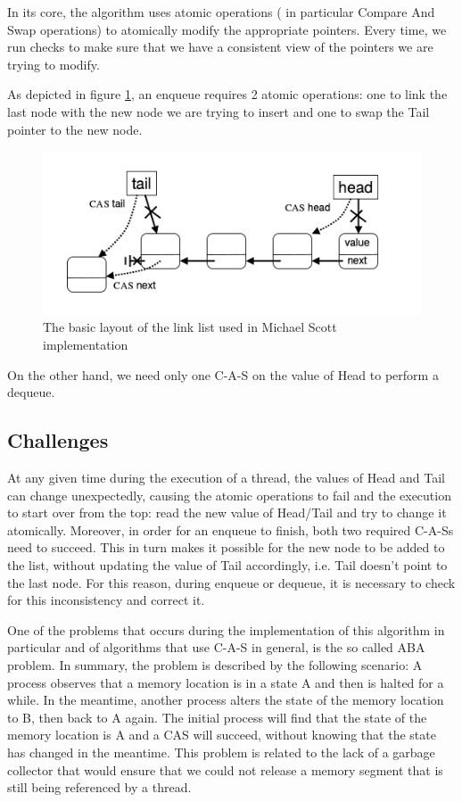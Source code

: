 In its core, the algorithm uses atomic operations ( in particular Compare And Swap operations) to atomically modify the appropriate pointers. Every time, we run checks to make sure that we have a consistent view of the pointers we are trying to modify.

As depicted in figure \ref{ms_queue_struct}, an enqueue requires 2 atomic operations: one to link the last node with the new node we are trying to insert and one to swap the Tail pointer to the new node.

\begin{figure}
 \centering
  \includegraphics[scale=0.4]{msqueue_struct.png}
\caption{ The basic layout of the link list used in Michael Scott implementation}
\label{ms_queue_struct}
\end{figure}

On the other hand, we need only one C-A-S on the value of Head to perform a dequeue.

\subsection{Challenges}
At any given time during the execution of a thread, the values of Head and Tail can change unexpectedly, causing the atomic operations to fail and the execution to start over from the top: read the new value of Head/Tail and try to change it atomically. Moreover, in order for an enqueue to finish, both two required C-A-Ss need to succeed. This in turn makes it possible for the new node to be added to the list, without updating the value of Tail accordingly, i.e. Tail doesn't point to the last node. For  this reason, during enqueue or dequeue, it is necessary to check for this inconsistency and correct it.

One of the problems that occurs during the implementation of this algorithm in particular and of algorithms that use C-A-S in general, is the so called ABA problem. In summary, the problem is described by the following scenario: A process observes that a memory location is in a state A and then is halted for a while. In the meantime, another process alters the state of the memory location to B, then back to A again. The initial process will find that the state of the memory location is A and a CAS will succeed, without knowing that the state has changed in the meantime. This problem is related to the lack of a garbage collector that would ensure that we could not release a memory segment that is still being referenced by a thread.

